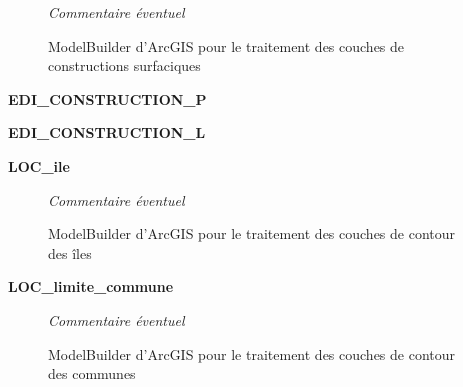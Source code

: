 \documentclass{themeensg}
\begin{document}
\begin{appendices}

\addtocounter{figure}{-1}
\begin{figure}
\addtocounter{figure}{1}
\centering
{}%
\caption{ModelBuilder d'ArcGIS pour le traitement des couches de constructions surfaciques}%
\textit{Commentaire éventuel}
\end{figure}


\clearpage


\begin{center}
    \Large
    \textbf{EDI\_CONSTRUCTION\_P}
\end{center}




\begin{center}
    \Large
    \textbf{EDI\_CONSTRUCTION\_L}
\end{center}



\clearpage


\begin{center}
    \Large
    \textbf{LOC\_ile}
\end{center}


\addtocounter{figure}{-1}
\begin{figure}
\addtocounter{figure}{1}
\centering
{}%
\caption{ModelBuilder d'ArcGIS pour le traitement des couches de contour des îles}%
\textit{Commentaire éventuel}
\end{figure}


\clearpage


\begin{center}
    \Large
    \textbf{LOC\_limite\_commune}
\end{center}


\addtocounter{figure}{-1}
\begin{figure}
\addtocounter{figure}{1}
\centering
{}%
\caption{ModelBuilder d'ArcGIS pour le traitement des couches de contour des communes}%
\textit{Commentaire éventuel}
\end{figure}



\end{appendices}
\end{document}
